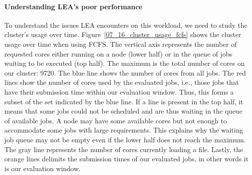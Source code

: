 \documentclass[conference,10pt]{IEEEtran}
\begin{document}
\paragraph{Understanding LEA's poor performance}
To understand the issues LEA encounters on this workload, we need to study the cluster's usage over time.
Figure~\ref{07_16_cluster_usage_fcfs} shows the cluster usage over time when using FCFS.
The vertical axis represents the number of requested cores either running on a
node (lower half) or in the queue of jobs waiting to be executed (top
half). The maximum is the total number of cores on our cluster: 9720.
The blue line shows the number of cores from all jobs.
The red lines show the number of cores used by the evaluated jobs, i.e.,
those jobs that have their submission time within our evaluation window. Thus, this forms a subset
of the set indicated by the blue line.
If a line is present in the top half, it means that some jobs could not be scheduled
and are thus waiting in the queue of available jobs. 
A node may have some available cores but not enough to accommodate some jobs with large requirements.
This explains why the waiting job queue may not be empty even if the lower half does not reach the maximum.
The gray line represents the number of cores currently loading a file.
Lastly, the orange lines delimits the submission times of our 
evaluated jobs, in other words it is our evaluation window.
\end{document}

